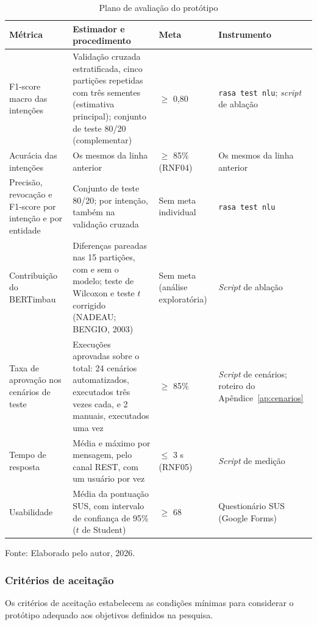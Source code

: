 \documentclass[12pt,a4paper]{extarticle}
\begin{document}
\begin{table}[H]
\centering
\caption{Plano de avaliação do protótipo}
\label{tab:plano-avaliacao}
\footnotesize
\begin{tabularx}{\textwidth}{L{2.7cm}YL{1.9cm}L{2.6cm}}
\hline
\textbf{Métrica} & \textbf{Estimador e procedimento} & \textbf{Meta} & \textbf{Instrumento} \\
\hline
F1-score macro das intenções & Validação cruzada estratificada, cinco partições repetidas com três sementes (estimativa principal); conjunto de teste 80/20 (complementar) & $\geq$ 0,80 & \texttt{rasa test nlu}; \textit{script} de ablação \\
Acurácia das intenções & Os mesmos da linha anterior & $\geq$ 85\% (RNF04) & Os mesmos da linha anterior \\
Precisão, revocação e F1-score por intenção e por entidade & Conjunto de teste 80/20; por intenção, também na validação cruzada & Sem meta individual & \texttt{rasa test nlu} \\
Contribuição do BERTimbau & Diferenças pareadas nas 15 partições, com e sem o modelo; teste de Wilcoxon e teste $t$ corrigido (NADEAU; BENGIO, 2003) & Sem meta (análise exploratória) & \textit{Script} de ablação \\
Taxa de aprovação nos cenários de teste & Execuções aprovadas sobre o total: 24 cenários automatizados, executados três vezes cada, e 2 manuais, executados uma vez & $\geq$ 85\% & \textit{Script} de cenários; roteiro do Apêndice~\ref{ap:cenarios} \\
Tempo de resposta & Média e máximo por mensagem, pelo canal REST, com um usuário por vez & $\leq$ 3 s (RNF05) & \textit{Script} de medição \\
Usabilidade & Média da pontuação SUS, com intervalo de confiança de 95\% ($t$ de Student) & $\geq$ 68 & Questionário SUS (Google Forms) \\
\hline
\end{tabularx}
\vspace{0.3cm}

\footnotesize{Fonte: Elaborado pelo autor, 2026.}
\end{table}


\subsubsection{Critérios de aceitação}
\label{sec:criterios-metodo}

Os critérios de aceitação estabelecem as condições mínimas para considerar o protótipo adequado aos objetivos definidos na pesquisa.
\end{document}
